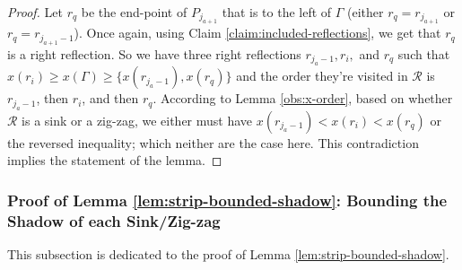 \documentclass[10pt,a4paper]{amsart}
\theoremstyle{thmstyleone}
\begin{document}
\begin{proof}
    Let $r_{q}$ be the end-point of $P_{j_{a+1}}$ that is to the left of $\Gamma$ (either $r_q = r_{j_{a+1}}$ or $r_q = r_{j_{a+1} - 1}$). Once again, using Claim \ref{claim:included-reflections}, we get that $r_{q}$ is a right reflection.
    So we have three right reflections $r_{j_a - 1}, r_{i},$ and $r_{q}$ such that $x(r_i) \ge x(\Gamma) \ge \{x(r_{j_a - 1}), x(r_q)\}$ and the order they're visited in $\mathcal R$ is $r_{j_a - 1}$, then $ r_i$, and then $r_q$. According to Lemma \ref{obs:x-order}, based on whether $\mathcal R$ is a sink or a zig-zag, we either must have $x(r_{j_a - 1}) < x(r_i) < x(r_q)$ or the reversed inequality; which neither are the case here. This contradiction implies the statement of the lemma.
\end{proof}

\subsubsection{Proof of Lemma \ref{lem:strip-bounded-shadow}: Bounding the Shadow of each Sink/Zig-zag}\label{sec:lemma-shadow-of-sink/zigzag}

This subsection is dedicated to the proof of Lemma \ref{lem:strip-bounded-shadow}. 
\end{document}
